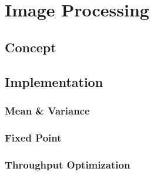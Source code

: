 %
%
\chapter{Image Processing}  \label{chapt:image_processing}

\section{Concept}

\section{Implementation}

\subsection{Mean \& Variance}

\subsection{Fixed Point}

\subsection{Throughput Optimization}
